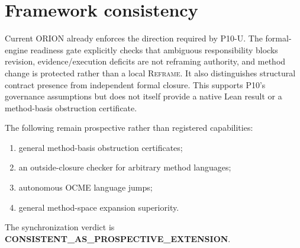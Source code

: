 \section{Framework consistency}
Current ORION already enforces the direction required by P10-U. The formal-engine readiness gate explicitly checks that ambiguous responsibility blocks revision, evidence/execution deficits are not reframing authority, and method change is protected rather than a local \textsc{Reframe}. It also distinguishes structural contract presence from independent formal closure. This supports P10's governance assumptions but does not itself provide a native Lean result or a method-basis obstruction certificate.

The following remain prospective rather than registered capabilities:
\begin{enumerate}
    \item general method-basis obstruction certificates;
    \item an outside-closure checker for arbitrary method languages;
    \item autonomous OCME language jumps;
    \item general method-space expansion superiority.
\end{enumerate}
The synchronization verdict is \textbf{CONSISTENT\_AS\_PROSPECTIVE\_EXTENSION}.

